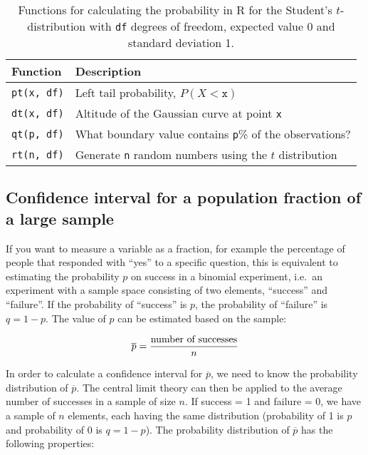 \begin{table}
  \centering
  \begin{tabular}{ll}
    \textbf{Function}     & \textbf{Description}                                      \\
    \midrule
  	\verb|pt(x, df)| & Left tail probability, $P(X<\mathtt{x})$                       \\
  	\verb|dt(x, df)| & Altitude of the Gaussian curve at point \texttt{x}             \\
  	\verb|qt(p, df)| & What boundary value contains \texttt{p}\% of the observations? \\
  	\verb|rt(n, df)| & Generate \texttt{n} random numbers using the $t$ distribution  \\ 
  \end{tabular}

  \caption{Functions for calculating the probability in R for the Student's $t$-distribution with \texttt{df} degrees of freedom, expected value 0 and standard deviation 1.}
  \label{tab:t-prob-r}
\end{table}

\subsection{Confidence interval for a population fraction of a large sample}
\label{ssec:confidence-interval-pop-fraction-large-sample}

If you want to measure a variable as a fraction, for example the percentage of people that responded with ``yes'' to a specific question, this is equivalent to estimating the probability $p$ on success in a binomial experiment, i.e.~an experiment with a sample space consisting of two elements, ``success'' and ``failure''. 
If the probability of ``success'' is $p$, the probability of ``failure'' is $q = 1 - p$. 
The value of $p$ can be estimated based on the sample:

\[ \overline{p} = \frac{\textnormal{number of successes}}{n} \]

In order to calculate a confidence interval for $\overline{p}$, we need to know the probability distribution of $\overline{p}$. 
The central limit theory can then be applied to the average number of successes in a sample of size $n$. 
If success = 1 and failure = 0, we have a sample of $n$ elements, each having the same distribution (probability of 1 is $p$ and probability of 0 is $q=1-p$).
The probability distribution of $\overline{p}$ has the following properties:

